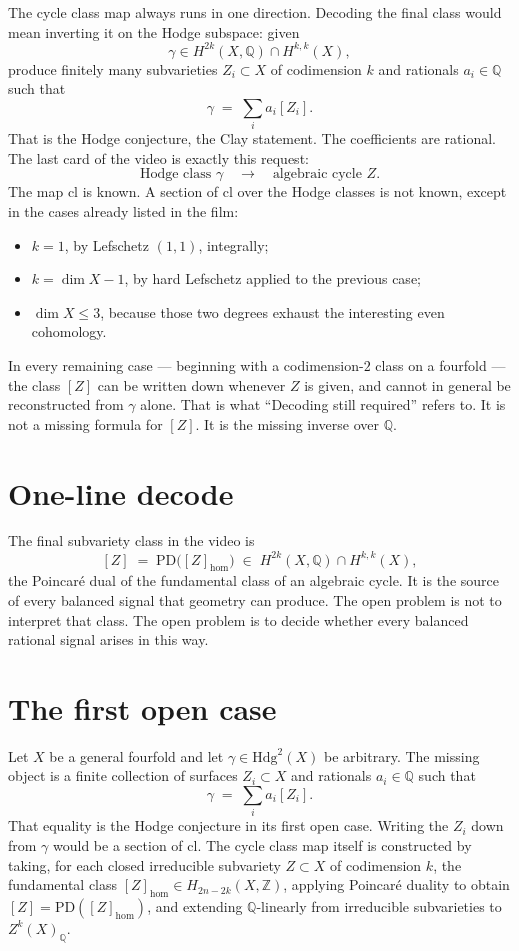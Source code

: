\documentclass[11pt,a4paper]{article}
\newcommand{\Q}{\mathbb{Q}}
\newcommand{\Z}{\mathbb{Z}}
\begin{document}
The cycle class map always runs in one direction. Decoding the final class would mean inverting it on the Hodge subspace: given
\[
\gamma\in H^{2k}(X,\Q)\cap H^{k,k}(X),
\]
produce finitely many subvarieties \(Z_i\subset X\) of codimension \(k\) and rationals \(a_i\in\Q\) such that
\[
\gamma\;=\;\sum_i a_i[Z_i].
\]
That is the Hodge conjecture, the Clay statement. The coefficients are rational. The last card of the video is exactly this request:
\[
\text{Hodge class }\gamma\quad\longrightarrow\quad\text{algebraic cycle }Z.
\]
The map \(\mathrm{cl}\) is known. A section of \(\mathrm{cl}\) over the Hodge classes is not known, except in the cases already listed in the film:
\begin{itemize}[leftmargin=1.6em]
\item \(k=1\), by Lefschetz \((1,1)\), integrally;
\item \(k=\dim X-1\), by hard Lefschetz applied to the previous case;
\item \(\dim X\le 3\), because those two degrees exhaust the interesting even cohomology.
\end{itemize}
In every remaining case --- beginning with a codimension-\(2\) class on a fourfold --- the class \([Z]\) can be written down whenever \(Z\) is given, and cannot in general be reconstructed from \(\gamma\) alone. That is what ``Decoding still required'' refers to. It is not a missing formula for \([Z]\). It is the missing inverse over \(\Q\).

\section*{One-line decode}

The final subvariety class in the video is
\[
[Z]\;=\;\mathrm{PD}\bigl([Z]_{\mathrm{hom}}\bigr)\;\in\;H^{2k}(X,\Q)\cap H^{k,k}(X),
\]
the Poincar\'e dual of the fundamental class of an algebraic cycle. It is the source of every balanced signal that geometry can produce. The open problem is not to interpret that class. The open problem is to decide whether every balanced rational signal arises in this way.

\section*{The first open case}

Let \(X\) be a general fourfold and let \(\gamma\in\mathrm{Hdg}^2(X)\) be arbitrary. The missing object is a finite collection of surfaces \(Z_i\subset X\) and rationals \(a_i\in\Q\) such that
\[
\gamma\;=\;\sum_i a_i[Z_i].
\]
That equality is the Hodge conjecture in its first open case. Writing the \(Z_i\) down from \(\gamma\) would be a section of \(\mathrm{cl}\). The cycle class map itself is constructed
by taking, for each closed irreducible subvariety \(Z\subset X\) of codimension \(k\), the fundamental class \([Z]_{\mathrm{hom}}\in H_{2n-2k}(X,\Z)\), applying Poincar\'e duality to obtain \([Z]=\mathrm{PD}([Z]_{\mathrm{hom}})\), and extending \(\Q\)-linearly from irreducible subvarieties to \(Z^k(X)_{\Q}\).
\end{document}

